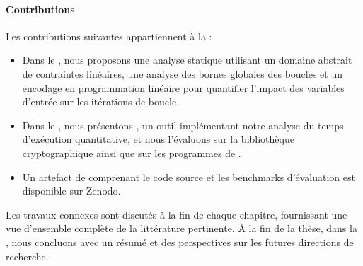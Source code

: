 {\paragraph{Contributions}

Les contributions suivantes appartiennent à la  :

\begin{itemize}
  \item Dans le , nous proposons une analyse statique utilisant un domaine abstrait de contraintes linéaires, une analyse des bornes globales des boucles et un encodage en programmation linéaire pour quantifier l'impact des variables d'entrée sur les itérations de boucle.
  \item Dans le , nous présentons \timesec\sidenote{\timesecurl}, un outil implémentant notre analyse du temps d'exécution quantitative, et nous l'évaluons sur la bibliothèque cryptographique \bignum\sidenote{\bignumurl} ainsi que sur les programmes de \svcomp\sidenote{\svcompurl}.
  \item Un artefact de \timesec{} comprenant le code source et les benchmarks d'évaluation est disponible sur Zenodo\sidenote{\timeseczenodo}.
\end{itemize}

\frenchdiv

Les travaux connexes sont discutés à la fin de chaque chapitre, fournissant une vue d'ensemble complète de la littérature pertinente. À la fin de la thèse, dans la , nous concluons avec un résumé et des perspectives sur les futures directions de recherche.
}
